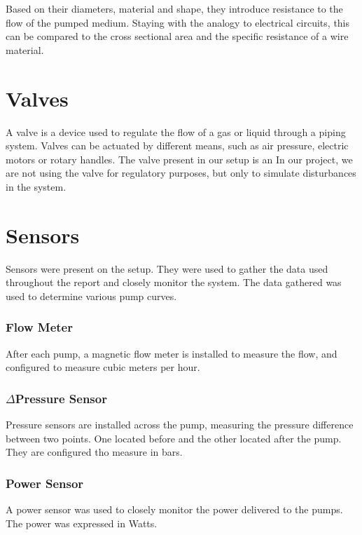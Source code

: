Based on their diameters, material and shape,
they introduce resistance to the flow of the pumped medium.
Staying with the analogy to electrical circuits,
this can be compared to the cross sectional area and the specific resistance of a wire material.

\section{Valves}
A valve is a device used to regulate the flow of a gas or liquid through a piping system.
Valves can be actuated by different means, such as air pressure, electric motors or rotary handles.
The valve present in our setup is an 
In our project, we are not using the valve for regulatory purposes,
but only to simulate disturbances in the system.

\section{Sensors}
Sensors were present on the setup. They were used to gather the data used throughout the report 
and closely monitor the system. The data gathered was used to determine various pump curves.

\subsubsection{Flow Meter}
After each pump, a magnetic flow meter is installed to measure the flow, and configured to measure 
cubic meters per hour.
\subsubsection{$\Delta$Pressure Sensor}
Pressure sensors are installed across the pump, measuring the pressure difference between two points.
One located before and the other located after the pump. They are configured tho measure in bars.
\subsubsection{Power Sensor}
A power sensor was used to closely monitor the power delivered to the pumps. The power was expressed
in Watts.
